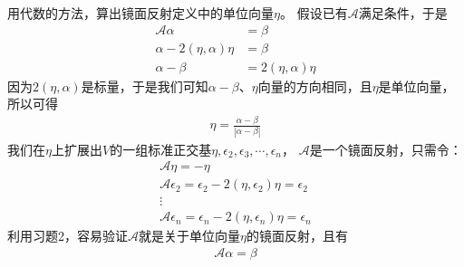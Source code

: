 \documentclass{article}
\begin{document}
用代数的方法，算出镜面反射定义中的单位向量$\eta$。
假设已有$\mathscr{A}$满足条件，于是
\begin{align*}
  \mathscr{A} \alpha            & = \beta                \\
  \alpha - 2(\eta, \alpha) \eta & = \beta                \\
  \alpha - \beta                & = 2(\eta, \alpha) \eta
\end{align*}
因为$2(\eta, \alpha)$是标量，于是我们可知$\alpha - \beta$、$\eta$向量的方向相同，且$\eta$是单位向量，所以可得
\begin{align*}
  \eta = \frac{\alpha - \beta}{|\alpha - \beta|}
\end{align*}
我们在$\eta$上扩展出$V$的一组标准正交基$\eta, \epsilon_2, \epsilon_3, \cdots, \epsilon_n$，
$\mathscr{A}$是一个镜面反射，只需令：
\begin{align*}
  \mathscr{A} \eta = - \eta                                                  \\
  \mathscr{A} \epsilon_2 = \epsilon_2 - 2(\eta, \epsilon_2)\eta = \epsilon_2 \\
  \vdots                                                                     \\
  \mathscr{A} \epsilon_n = \epsilon_n - 2(\eta, \epsilon_n)\eta = \epsilon_n
\end{align*}
利用习题2，容易验证$\mathscr{A}$就是关于单位向量$\eta$的镜面反射，且有
\begin{align*}
  \mathscr{A} \alpha = \beta
\end{align*}
\end{document}
